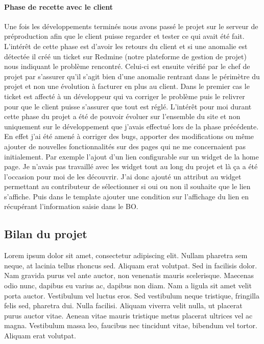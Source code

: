 \documentclass[a4paper,11pt,twoside]{report}
\begin{document}
	\paragraph*{Phase de recette avec le client}
	Une fois les développements terminés nous avons passé le projet sur le serveur de préproduction afin que le client puisse regarder et tester ce qui avait été fait. L'intérêt de cette phase est d'avoir les retours du client et si une anomalie est détectée il créé un ticket sur Redmine (notre plateforme de gestion de projet) nous indiquant le problème rencontré. Celui-ci est ensuite vérifié par le chef de projet par s'assurer qu'il s'agit bien d'une anomalie rentrant dans le périmètre du projet et non une évolution à facturer en plus au client. Dans le premier cas le ticket est affecté à un développeur qui va corriger le problème puis le relivrer pour que le client puisse s'assurer que tout est réglé. L'intérêt pour moi durant cette phase du projet a été de pouvoir évoluer sur l'ensemble du site et non uniquement sur le développement que j'avais effectué lors de la phase précédente. En effet j'ai été amené à corriger des bugs, apporter des modifications ou même ajouter de nouvelles fonctionnalités sur des pages qui ne me concernaient pas initialement. Par exemple l'ajout d'un lien configurable sur un widget de la home page. Je n'avais pas travaillé avec les widget tout au long du projet et là ça a été l'occasion pour moi de les découvrir. J'ai donc ajouté un attribut au widget permettant au contributeur de sélectionner si oui ou non il souhaite que le lien s'affiche. Puis dans le template ajouter une condition sur l'affichage du lien en récupérant l'information saisie dans le BO.  
    \subsection*{Bilan du projet}
    Lorem ipsum dolor sit amet, consectetur adipiscing elit. Nullam pharetra sem neque, at lacinia tellus rhoncus sed. Aliquam erat volutpat. Sed in facilisis dolor. Nam gravida purus vel ante auctor, non venenatis mauris scelerisque. Maecenas odio nunc, dapibus eu varius ac, dapibus non diam. Nam a ligula sit amet velit porta auctor. Vestibulum vel luctus eros. Sed vestibulum neque tristique, fringilla felis sed, pharetra dui. Nulla facilisi. Aliquam viverra velit nulla, ut placerat purus auctor vitae. Aenean vitae mauris tristique metus placerat ultrices vel ac magna. Vestibulum massa leo, faucibus nec tincidunt vitae, bibendum vel tortor. Aliquam erat volutpat.
    
\end{document}
